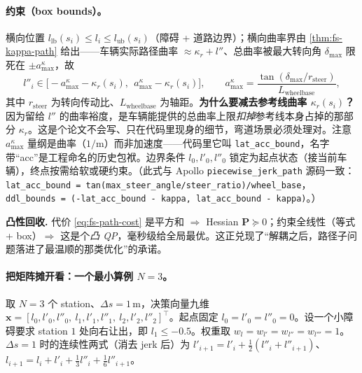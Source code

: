 \paragraph{约束（box bounds）。}
横向位置 $l_{\mathrm{lb}}(s_i)\le l_i\le l_{\mathrm{ub}}(s_i)$（障碍 + 道路边界）；横向曲率界由 \cref{thm:fs-kappa-path} 给出——车辆实际路径曲率 $\approx\kappa_r+l''$、总曲率被最大转向角 $\delta_{\max}$ 限死在 $\pm a^\kappa_{\max}$，故
\begin{equation}
  l''_i\in\big[-a^\kappa_{\max}-\kappa_r(s_i),\ \ a^\kappa_{\max}-\kappa_r(s_i)\big],
  \qquad a^\kappa_{\max}=\frac{\tan(\delta_{\max}/r_{\mathrm{steer}})}{L_{\mathrm{wheelbase}}},
  \label{eq:fs-ddl-bound}
\end{equation}
其中 $r_{\mathrm{steer}}$ 为转向传动比、$L_{\mathrm{wheelbase}}$ 为轴距。\textbf{为什么要减去参考线曲率 $\kappa_r(s_i)$？}因为留给 $l''$ 的曲率裕度，是车辆能提供的总曲率上限\emph{扣掉}参考线本身占掉的那部分 $\kappa_r$。这是个论文不会写、只在代码里现身的细节，弯道场景必须处理对。注意 $a^\kappa_{\max}$ 量纲是曲率（$1/\mathrm{m}$）而非加速度——代码里它叫 \texttt{lat\_acc\_bound}，名字带“acc”是工程命名的历史包袱。边界条件 $l_0,l'_0,l''_0$ 锁定为起点状态（接当前车辆），终点按需给软或硬约束。（此式与 Apollo \texttt{piecewise\_jerk\_path} 源码一致：\texttt{lat\_acc\_bound = tan(max\_steer\_angle/\allowbreak steer\_ratio)/\allowbreak wheel\_base}，\texttt{ddl\_bounds = (-lat\_acc\_bound - kappa,\ lat\_acc\_bound - kappa)}。）

\begin{note}
\textbf{凸性回收.}\;
代价 \cref{eq:fs-path-cost} 是平方和 $\Rightarrow$ Hessian $\mathbf{P}\succeq0$；约束全线性（等式 + box）$\Rightarrow$ 这是个\emph{凸 QP}，毫秒级给全局最优。这正兑现了“解耦之后，路径子问题落进了最温顺的那类优化”的承诺。
\end{note}

\paragraph{把矩阵摊开看：一个最小算例 $N=3$。}
取 $N=3$ 个 station、$\Delta s=1\,\mathrm{m}$，决策向量九维 $\mathbf{x}=[l_0,l'_0,l''_0,\ l_1,l'_1,l''_1,\ l_2,l'_2,l''_2]^\top$。起点固定 $l_0=l'_0=l''_0=0$。设一个小障碍要求 station $1$ 处向右让出，即 $l_1\le-0.5$。权重取 $w_l=w_{l'}=w_{l''}=w_{l'''}=1$。$\Delta s=1$ 时的连续性两式（消去 jerk 后）为 $l'_{i+1}=l'_i+\tfrac12(l''_i+l''_{i+1})$、$l_{i+1}=l_i+l'_i+\tfrac13 l''_i+\tfrac16 l''_{i+1}$。

